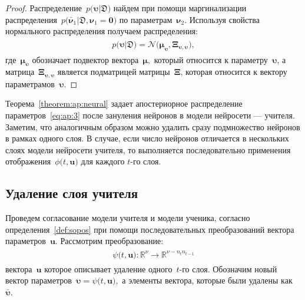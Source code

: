 \documentclass[12pt]{a&t}
\begin{document}
\begin{proof}
Распределение~$p\bigr(\bm{\upsilon}|\mathfrak{D}\bigr)$ найдем при помощи маргинализации распределения~$p\bigr(\bar{\bm{\nu}}_1|\mathfrak{D}, \bm{\nu}_1=\mathbf{0}\bigr)$ по параметрам~$\bm{\nu}_2.$ Используя свойства нормального распределения получаем распределения:
\begin{gather}
\label{eq:ap:3}
\begin{aligned}
p\bigr(\bm{\upsilon}|\mathfrak{D}\bigr) = \mathcal{N}\bigr(\bm{\mu}_{\bm{\upsilon}},  \bm{\Xi}_{\bm{\upsilon}, \bm{\upsilon}}\bigr),
\end{aligned}
\end{gather}
где~$\bm{\mu}_{\bm{\upsilon}}$ обозначает подвектор вектора~$\bm{\mu},$ который относится к параметру~$\bm{\upsilon}$, а матрица~$\bm{\Xi}_{\bm{\upsilon}, \bm{\upsilon}}$ является подматрицей матрицы~$\bm{\Xi}$, которая относится к вектору параметрамов~$\bm{\upsilon}.$
\end{proof}

Теорема~\ref{theorem:ap:neural} задает апостериорное распределение параметров~\eqref{eq:ap:3} после зануления нейронов в модели нейросети --- учителя. Заметим, что аналогичным образом можно удалить сразу подмножество нейронов в рамках одного слоя. В случае, если число нейронов отличается в нескольких слоях модели нейросети учителя, то выполняется последовательно применения отображения~$\phi\bigr(t, \mathbf{u}\bigr)$ для каждого $t$-го слоя.

\subsection{Удаление слоя учителя}
Проведем согласование модели учителя и модели ученика, согласно определения~\ref{def:sopos} при помощи последовательных преобразований вектора параметров~$\mathbf{u}$. Рассмотрим преобразование:
\begin{gather}
\label{eq:ap:4}
\begin{aligned}
\psi\bigr(t, \mathbf{u}\bigr) : \mathbb{R}^{\nu} \to \mathbb{R}^{\nu-n_tn_{t-1}}
\end{aligned}
\end{gather}
вектора~$\mathbf{u}$ которое описывает удаление одного~$t$-го слоя.
Обозначим новый вектор параметров~$\bm{\upsilon} = \psi\bigr(t, \mathbf{u}\bigr),$ а элементы вектора, которые были удалены как~$\bar{\bm{\upsilon}}.$ 
\end{document}
